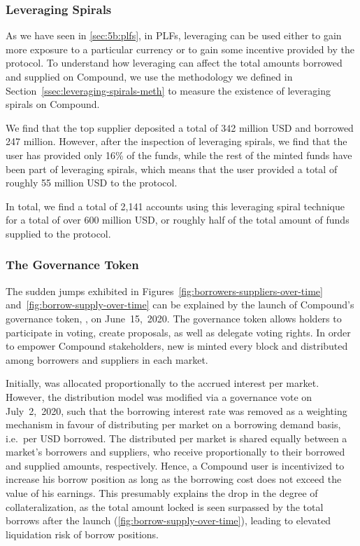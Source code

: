\subsubsection{Leveraging Spirals}
As we have seen in \autoref{sec:5b:plfs}, in PLFs, leveraging can be used either to gain more exposure to a particular currency or to gain some incentive provided by the protocol.
To understand how leveraging can affect the total amounts borrowed and supplied on Compound, we use the methodology we defined in Section~\ref{ssec:leveraging-spirals-meth} to measure the existence of leveraging spirals on Compound.

We find that the top supplier deposited a total of 342 million USD and borrowed 247 million.
However, after the inspection of leveraging spirals, we find that the user has provided only 16\% of the funds, while the rest of the minted funds have been part of leveraging spirals, which means that the user provided a total of roughly 55 million USD to the protocol.

In total, we find a total of 2,141 accounts using this leveraging spiral technique for a total of over 600 million USD, or roughly half of the total amount of funds supplied to the protocol.

\subsubsection{The  Governance Token}
The sudden jumps exhibited in Figures~\ref{fig:borrowers-suppliers-over-time} and~\ref{fig:borrow-supply-over-time} can be explained by the launch of Compound's governance token, , on June~15,~2020.
The  governance token allows holders to participate in voting, create proposals, as well as delegate voting rights.
In order to empower Compound stakeholders, new  is minted every block and distributed among borrowers and suppliers in each market.

Initially,  was allocated proportionally to the accrued interest per market.
However, the  distribution model was modified via a governance vote on July~2,~2020, such that the borrowing interest rate was removed as a weighting mechanism in favour of distributing  per market on a borrowing demand basis, i.e.\ per USD borrowed.
The distributed  per market is shared equally between a market's borrowers and suppliers, who receive  proportionally to their borrowed and supplied amounts, respectively.
Hence, a Compound user is incentivized to increase his borrow position as long as the borrowing cost does not exceed the value of his  earnings. This presumably explains the drop in the degree of collateralization, as the total amount locked is seen surpassed by the total borrows after the  launch (\autoref{fig:borrow-supply-over-time}), leading to elevated liquidation risk of borrow positions.



